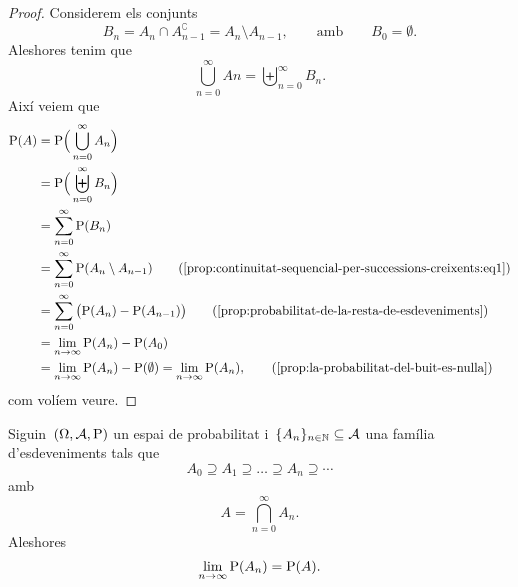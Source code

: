 \documentclass[../../main.tex]{subfiles}
\begin{document}
    \begin{proof}
        Considerem els conjunts
        \begin{equation}
            \label{prop:continuitat-sequencial-per-successions-creixents:eq1}
            B_{n}=A_{n}\cap A_{n-1}^{\complement}=A_{n}\setminus A_{n-1},\qquad\text{amb}\qquad B_{0}=\emptyset.
        \end{equation}
        Aleshores tenim que %
        \[
            \bigcup_{n=0}^{\infty}A{n}=\biguplus_{n=0}^{\infty}B_{n}.
        \]
        Així veiem que
        \begin{align*}
            \Probabilitat(A)&=\Probabilitat\Big(\bigcup_{n=0}^{\infty}A_{n}\Big) \\
            &=\Probabilitat\Big(\biguplus_{n=0}^{\infty}B_{n}\Big) \\
            &=\sum_{n=0}^{\infty}\Probabilitat(B_{n}) \\
            &=\sum_{n=0}^{\infty}\Probabilitat(A_{n}\setminus A_{n-1}) \tag{\ref{prop:continuitat-sequencial-per-successions-creixents:eq1}}\\
            &=\sum_{n=0}^{\infty}\big(\Probabilitat(A_{n})-\Probabilitat(A_{n-1})\big)\tag{\ref{prop:probabilitat-de-la-resta-de-esdeveniments}} \\
            &=\lim_{n\to\infty}\Probabilitat(A_{n})-\Probabilitat(A_{0}) \\
            &=\lim_{n\to\infty}\Probabilitat(A_{n})-\Probabilitat(\emptyset)=\lim_{n\to\infty}\Probabilitat(A_{n}), \tag{\ref{prop:la-probabilitat-del-buit-es-nulla}}
        \end{align*}
        com volíem veure.
    \end{proof}
    \begin{proposition}
        \label{prop:continuitat-sequencial-per-successions-decreixents}
        Siguin~\((\Omega,\mathcal{A},\mathrm{P})\) un espai de probabilitat i~\(\{A_{n}\}_{n\in\mathbb{N}}\subseteq\mathcal{A}\) una família d'esdeveniments tals que
        \[
            A_{0}\supseteq A_{1}\supseteq\dots\supseteq A_{n}\supseteq\cdots
        \]
        amb
        \[
            A=\bigcap_{n=0}^{\infty}A_{n}.
        \]
        Aleshores
        \[
            \lim_{n\to\infty}\mathrm{P}(A_{n})=\mathrm{P}(A).
        \]
    \end{proposition}
\end{document}
